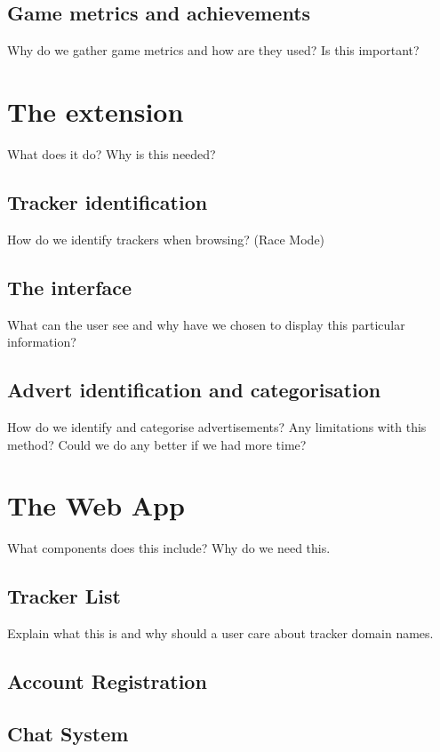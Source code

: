 \documentclass{l4proj}
\begin{document}
\subsection{Game metrics and achievements}
Why do we gather game metrics and how are they used? Is this important?

\section{The extension}
What does it do? Why is this needed?

\subsection{Tracker identification}
How do we identify trackers when browsing? (Race Mode)

\subsection{The interface}
What can the user see and why have we chosen to display this particular information?

\subsection{Advert identification and categorisation}
How do we identify and categorise advertisements? Any limitations with this method? Could we do any better if we had more time?

\section{The Web App}
What components does this include? Why do we need this.

\subsection{Tracker List}
Explain what this is and why should a user care about tracker domain names.

\subsection{Account Registration}

\subsection{Chat System}
\end{document}
